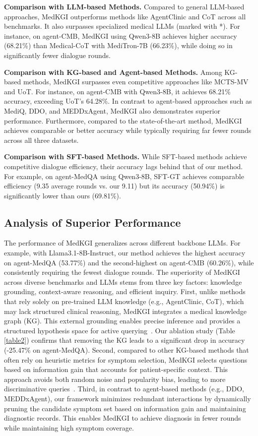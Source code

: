 \documentclass[11pt]{article}
\newcommand{\tool}{MedKGI{\xspace}}
\begin{document}
\textbf{Comparison with LLM-based Methods.}
Compared to general LLM-based approaches, \tool{} outperforms methods like AgentClinic and CoT across all benchmarks. It also surpasses specialized medical LLMs (marked with *). For instance, on agent-CMB, \tool{} using Qwen3-8B achieves higher accuracy (68.21\%) than Medical-CoT with MediTron-7B (66.23\%), while doing so in significantly fewer dialogue rounds.

\textbf{Comparison with KG-based and Agent-based Methods.}
Among KG-based methods, \tool{} surpasses even competitive approaches like MCTS-MV and UoT. For instance, on agent-CMB with Qwen3-8B, it achieves 68.21\% accuracy, exceeding UoT’s 64.28\%. In contrast to agent-based approaches such as MediQ, DDO, and MEDDxAgent, \tool{} also demonstrates superior performance. Furthermore, compared to the state-of-the-art method, \tool{} achieves comparable or better accuracy while typically requiring far fewer rounds across all three datasets.

\textbf{Comparison with SFT-based Methods.}
While SFT-based methods achieve competitive dialogue efficiency, their accuracy lags behind that of our method. For example, on agent-MedQA using Qwen3-8B, SFT-GT achieves comparable efficiency (9.35 average rounds vs. our 9.11) but its accuracy (50.94\%) is significantly lower than ours (69.81\%).



\subsection{Analysis of Superior Performance}

The performance of \tool{} generalizes across different backbone LLMs. For example, with Llama3.1-8B-Instruct, our method achieves the highest accuracy on agent-MedQA (53.77\%) and the second-highest on agent-CMB (60.26\%), while consistently requiring the fewest dialogue rounds.
The superiority of \tool{} across diverse benchmarks and LLMs stems from three key factors: knowledge grounding, context-aware reasoning, and efficient inquiry.
First, unlike methods that rely solely on pre-trained LLM knowledge (e.g., AgentClinic, CoT), which may lack structured clinical reasoning, \tool{} integrates a medical knowledge graph (KG). This external grounding enables precise inference and provides a structured hypothesis space for active querying~\cite{medikal2025jia}. Our ablation study (Table \ref{table2}) confirms that removing the KG leads to a significant drop in accuracy (-25.47\% on agent-MedQA).
Second, compared to other KG-based methods that often rely on heuristic metrics for symptom selection, \tool{} selects questions based on information gain that accounts for patient-specific context. This approach avoids both random noise and popularity bias, leading to more discriminative queries~\cite{llmreasoning2025kim}.
Third, in contrast to agent-based methods (e.g., DDO, MEDDxAgent), our framework minimizes redundant interactions by dynamically pruning the candidate symptom set based on information gain and maintaining diagnostic records. This enables \tool{} to achieve diagnosis in fewer rounds while maintaining high symptom coverage.
\end{document}
